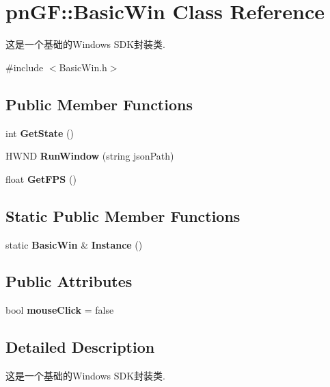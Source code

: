 \section{pn\+GF\+:\+:Basic\+Win Class Reference}
\label{classpn_g_f_1_1_basic_win}


这是一个基础的\+Windows S\+D\+K封装类.  




{\ttfamily \#include $<$Basic\+Win.\+h$>$}

\subsection*{Public Member Functions}
\begin{DoxyCompactItemize}
\item 
\mbox{\label{classpn_g_f_1_1_basic_win_a3087c39b495228b666f3f8451612bd65}} 
int {\bfseries Get\+State} ()
\item 
\mbox{\label{classpn_g_f_1_1_basic_win_a6fc3268467490bb3479ae2a9c0ca4a19}} 
H\+W\+ND {\bfseries Run\+Window} (string json\+Path)
\item 
\mbox{\label{classpn_g_f_1_1_basic_win_a0c31efd46272c2e96285bb2d6c7be730}} 
float {\bfseries Get\+F\+PS} ()
\end{DoxyCompactItemize}
\subsection*{Static Public Member Functions}
\begin{DoxyCompactItemize}
\item 
\mbox{\label{classpn_g_f_1_1_basic_win_a0837fa53d748541c85ee72deccb1e06c}} 
static \textbf{ Basic\+Win} \& {\bfseries Instance} ()
\end{DoxyCompactItemize}
\subsection*{Public Attributes}
\begin{DoxyCompactItemize}
\item 
\mbox{\label{classpn_g_f_1_1_basic_win_a791e99e3dbe204705c87d990597f8146}} 
bool {\bfseries mouse\+Click} = false
\end{DoxyCompactItemize}


\subsection{Detailed Description}
这是一个基础的\+Windows S\+D\+K封装类. 

